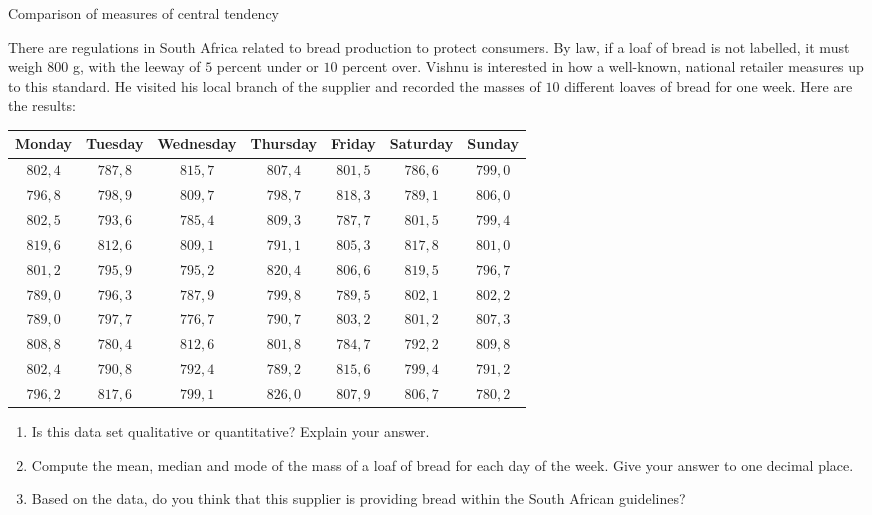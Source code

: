 \begin{wex}{Comparison of measures of central tendency}{
    There are regulations in South Africa related to bread production
    to protect consumers. By law, if a loaf of bread is not labelled,
    it must weigh $800$ g, with the leeway of $5$ percent under or $10$
    percent over.  Vishnu is interested in how a well-known, national
    retailer measures up to this standard. He visited his local branch
    of the supplier and recorded the masses of $10$ different loaves
    of bread for one week. Here are the results:

    \begin{center}
      \begin{tabular}{ccccccc}
        \toprule
        Monday & Tuesday & Wednesday & Thursday & Friday & Saturday & Sunday \\
        \midrule
        $802,4$ & $787,8$ & $815,7$ & $807,4$ & $801,5$ & $786,6$ & $799,0$ \\
        $796,8$ & $798,9$ & $809,7$ & $798,7$ & $818,3$ & $789,1$ & $806,0$ \\
        $802,5$ & $793,6$ & $785,4$ & $809,3$ & $787,7$ & $801,5$ & $799,4$ \\
        $819,6$ & $812,6$ & $809,1$ & $791,1$ & $805,3$ & $817,8$ & $801,0$ \\
        $801,2$ & $795,9$ & $795,2$ & $820,4$ & $806,6$ & $819,5$ & $796,7$ \\
        $789,0$ & $796,3$ & $787,9$ & $799,8$ & $789,5$ & $802,1$ & $802,2$ \\
        $789,0$ & $797,7$ & $776,7$ & $790,7$ & $803,2$ & $801,2$ & $807,3$ \\
        $808,8$ & $780,4$ & $812,6$ & $801,8$ & $784,7$ & $792,2$ & $809,8$ \\
        $802,4$ & $790,8$ & $792,4$ & $789,2$ & $815,6$ & $799,4$ & $791,2$ \\
        $796,2$ & $817,6$ & $799,1$ & $826,0$ & $807,9$ & $806,7$ & $780,2$ \\
        \bottomrule
      \end{tabular}
    \end{center}

    \begin{enumerate}[noitemsep, label=\textbf{\arabic*}.]
    \item Is this data set qualitative or quantitative? Explain your
      answer.
    \item Compute the mean, median and mode of the mass of a loaf of bread
      for each day of the week. Give your answer to one decimal place.
    \item Based on the data, do you think that this supplier is
      providing bread within the South African guidelines?
    \end{enumerate}
}{

}
\end{wex}
